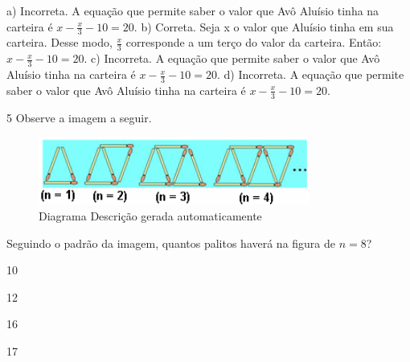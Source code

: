 \begin{escolha}
\begin{escolha}
\begin{escolha}
\begin{escolha}
{\begin{boxmedio}
\begin{boxpeq}
\begin{q°}
\begin{boxmedio}
\begin{boxpeq}
\begin{boxpeq}
\begin{boxmedio}
\begin{boxmedio}
\begin{boxmedio}
\begin{largebox}
\begin{boxmedio}
{\begin{enumerate}
\begin{boxpeq}
{\begin{boxpeq}
\begin{boxpeq}
\begin{boxmedio}
\begin{boxpeq}
\begin{boxpeq}
\begin{boxpeq}
{a) Incorreta. A equação que permite saber o valor que Avô Aluísio tinha na carteira é 
$x - \frac{x}{3} - 10 = 20$. 
b) Correta. Seja x o valor que Aluísio tinha em sua carteira. Desse modo,
$\frac{x}{3}$ corresponde a um terço do valor da carteira. Então: 
$x - \frac{x}{3} - 10 = 20$.
c) Incorreta. A equação que permite saber o valor que Avô Aluísio tinha na carteira é 
$x - \frac{x}{3} - 10 = 20$. 
d) Incorreta. A equação que permite saber o valor que Avô Aluísio tinha na carteira é 
$x - \frac{x}{3} - 10 = 20$.} 

\num{5} Observe a imagem a seguir. 

\begin{figure}
\centering
\includegraphics[width=3.5in,height=0.875in]{./_SAEB_9_MAT/media/image241.png}
\caption{Diagrama Descrição gerada automaticamente}
\end{figure}


Seguindo o padrão da imagem, quantos palitos haverá na figura de $n = 8$?

\begin{escolha}

  \item 10

  \item 12

  \item 16

  \item 17

\end{escolha}

\end{boxpeq}
\end{boxpeq}
\end{boxpeq}
\end{boxmedio}
\end{boxpeq}
\end{boxpeq}}
\end{boxpeq}
\end{enumerate}}
\end{boxmedio}
\end{largebox}
\end{boxmedio}
\end{boxmedio}
\end{boxmedio}
\end{boxpeq}
\end{boxpeq}
\end{boxmedio}
\end{q°}
\end{boxpeq}
\end{boxmedio}}
\end{escolha}
\end{escolha}
\end{escolha}
\end{escolha}

